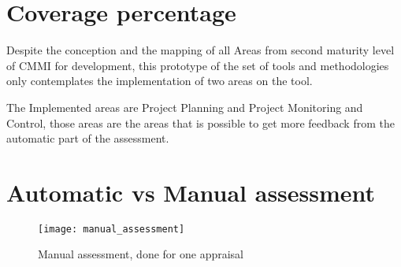 \section{Coverage percentage} \label{sec:coverage}



Despite the conception and the mapping of all Areas from second maturity level of CMMI for development, this prototype of the set of tools and methodologies only contemplates the implementation of two areas on the tool.

The Implemented areas are Project Planning and Project Monitoring and Control, those areas are the areas that is possible to get more feedback from the automatic part of the assessment. 
 
\section{Automatic vs Manual assessment} \label{sec:automatic}

\begin{figure}[h]
	\begin{center}
		\leavevmode
		\texttt{[image: manual\_assessment]}
		\caption{Manual assessment, done for one appraisal}
		\label{fig:manual_assessment}
	\end{center}
\end{figure}
